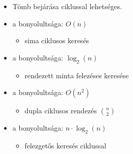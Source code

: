 \documentclass[main.tex]{subfiles}
\begin{document}
  \begin{itemize}
    \item Tömb bejárása  ciklussal lehetséges.
  \end{itemize}

  \begin{itemize}
    \item a  bonyolultsága: $O(n)$
    \begin{itemize}
      \item sima  ciklusos keresés
    \end{itemize}

    \item a  bonyolultsága: $\log_2(n)$
    \begin{itemize}
      \item rendezett minta felezéses keresése
    \end{itemize}
  \end{itemize}

  \begin{itemize}
    \item a  bonyolultsága: $O(n^2)$
    \begin{itemize}
      \item dupla  ciklusos rendezés $\binom{n}{2}$
    \end{itemize}

    \item a  bonyolultsága: $n \cdot \log_2(n)$
    \begin{itemize}
      \item felezgetős keresés  ciklussal
    \end{itemize}
  \end{itemize}
\end{document}
